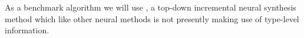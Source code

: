\documentclass{article}
\begin{document}





As a benchmark algorithm we will use \cite{nsps}, a top-down incremental neural synthesis method which like other neural methods is not presently making use of type-level information.
\end{document}
